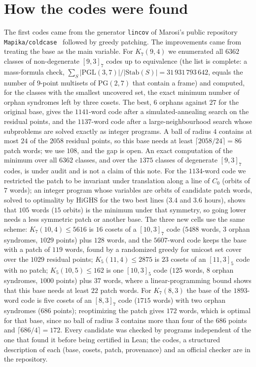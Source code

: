 \documentclass[11pt]{amsart}
\theoremstyle{definition}
\theoremstyle{remark}
\begin{document}
\section{How the codes were found}
The first codes came from the generator \texttt{lincov} of Marosi's public repository \texttt{Mapika/coldcase}~\cite{marosi2026} followed by greedy patching.
The improvements came from treating the base as the main variable.
For $K_7(9,4)$ we enumerated all $6362$ classes of non-degenerate $[9,3]_7$ codes up to equivalence (the list is complete: a mass-formula check, $\sum_S |\mathrm{PGL}(3,7)|/|\mathrm{Stab}(S)| = 31\,931\,793\,642$, equals the number of $9$-point multisets of $\mathrm{PG}(2,7)$ that contain a frame) and computed, for the classes with the smallest uncovered set, the exact minimum number of orphan syndromes left by three cosets.
The best, $6$ orphans against $27$ for the original base, gives the $1141$-word code after a simulated-annealing search on the residual points, and the $1137$-word code after a large-neighbourhood search whose subproblems are solved exactly as integer programs.
A ball of radius $4$ contains at most $24$ of the $2058$ residual points, so this base needs at least $\lceil 2058/24\rceil = 86$ patch words; we use $108$, and the gap is open.
An exact computation of the minimum over all $6362$ classes, and over the $1375$ classes of degenerate $[9,3]_7$ codes, is under audit and is not a claim of this note.
For the $1134$-word code we restricted the patch to be invariant under translation along a line of $C_0$ (orbits of $7$ words); an integer program whose variables are orbits of candidate patch words, solved to optimality by HiGHS for the two best lines ($3.4$ and $3.6$ hours), shows that $105$ words ($15$ orbits) is the minimum under that symmetry, so going lower needs a less symmetric patch or another base.
The three new cells use the same scheme: $K_7(10,4)\le 5616$ is $16$ cosets of a $[10,3]_7$ code ($5488$ words, $3$ orphan syndromes, $1029$ points) plus $128$ words, and the $5607$-word code keeps the base with a patch of $119$ words, found by a randomized greedy for unicost set cover over the $1029$ residual points; $K_5(11,4)\le 2875$ is $23$ cosets of an $[11,3]_5$ code with no patch; $K_5(10,5)\le 162$ is one $[10,3]_5$ code ($125$ words, $8$ orphan syndromes, $1000$ points) plus $37$ words, where a linear-programming bound shows that this base needs at least $22$ patch words.
For $K_7(8,3)$ the base of the $1893$-word code is five cosets of an $[8,3]_7$ code ($1715$ words) with two orphan syndromes ($686$ points); reoptimizing the patch gives $172$ words, which is optimal for that base, since no ball of radius $3$ contains more than four of the $686$ points and $\lceil 686/4\rceil=172$.
Every candidate was checked by programs independent of the one that found it before being certified in Lean; the codes, a structured description of each (base, cosets, patch, provenance) and an official checker are in the repository.
\end{document}
